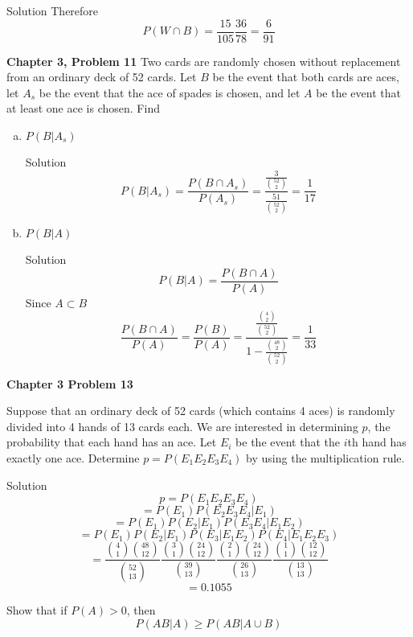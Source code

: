 \documentclass{article}
\begin{document}
\begin{spacing}{1.1}
\begin{homeworkProblem}
\begin{homeworkSection}{Solution}
    Therefore 
    \[P( W \cap B) = \frac{ 15}{ 105} \frac{ 36}{ 78} = \frac{ 6}{ 91}\]

  \end{homeworkSection}
\end{homeworkProblem}
\newpage
\begin{homeworkProblem}
  {\bf Chapter 3, Problem 11}
  Two cards are randomly chosen without replacement from an ordinary deck of 52 cards. 
  Let $B$ be the event that both cards are aces, let $A_s$ be the event that the ace 
  of spades is chosen, and let $A$ be the event that at least one ace is chosen. Find
  \begin{enumerate}[(a)]
    \item $P( B|A_s)$
      \begin{homeworkSection}{Solution}
        \[P( B|A_s) = \frac{ P( B \cap A_s)}{ P( A_s)} = \frac{ \frac{ 3}{ {52 \choose 2}}}{ \frac{ 51}{ {52 \choose 2}}} = \frac{ 1}{ 17}\]
      \end{homeworkSection}
    \item $P( B|A)$
      \begin{homeworkSection}{Solution}
        \[P( B|A) = \frac{ P( B \cap A)}{ P( A)}\]
        Since $ A \subset B$
        \[\frac{ P( B \cap A)}{ P( A)} = \frac{ P( B)}{ P( A)} = \frac{ \frac{ {4 \choose 2}}{ {52 \choose 2}}}{ 1 - \frac{ {48 \choose 2}}{ {52 \choose 2}}} = \frac{ 1}{ 33}\]
      \end{homeworkSection}
  \end{enumerate}
\end{homeworkProblem}
\newpage
\begin{homeworkProblem}
  {\bf Chapter 3 Problem 13}
  
  Suppose that an ordinary deck of 52 cards (which contains 4 aces) is randomly 
  divided into 4 hands of 13 cards each. We are interested in determining $p$, 
  the probability that each hand has an ace. Let $E_i$ be the event that the 
  $i$th hand has exactly one ace. Determine $p = P( E_1 E_2 E_3 E_4)$ 
  by using the multiplication rule.
  
  \begin{homeworkSection}{Solution}
    \[p = P( E_1 E_2 E_3 E_4) \]
    \[= P( E_1) P( E_2 E_3 E_4|E_1)\]
    \[= P( E_1) P( E_2|E_1) P( E_3 E_4|E_1 E_2)\]
    \[= P( E_1) P( E_2|E_1) P( E_3|E_1 E_2) P( E_4|E_1 E_2 E_3)\]
    \[ = \frac{ {4 \choose 1} {48 \choose 12}}{ {52 \choose 13}} \frac{ {3 \choose 1} {24 \choose 12}}{ {39 \choose 13}} \frac{ {2 \choose 1} {24 \choose 12}}{ {26 \choose 13}} \frac{ {1 \choose 1} {12 \choose 12}}{ {13 \choose 13}}\]
        \[= 0.1055\]
  \end{homeworkSection}
\end{homeworkProblem}
\newpage
\begin{homeworkProblem}
  Show that if $P( A) > 0$, then
    \[P(AB|A) \ge P( AB|A \cup B)\]


\end{homeworkProblem}
\end{spacing}
\end{document}
